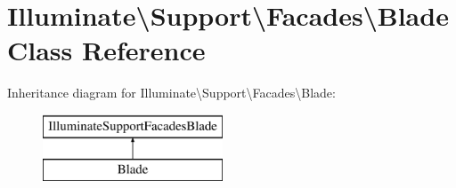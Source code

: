 \hypertarget{class_illuminate_1_1_support_1_1_facades_1_1_blade}{}\section{Illuminate\textbackslash{}Support\textbackslash{}Facades\textbackslash{}Blade Class Reference}
\label{class_illuminate_1_1_support_1_1_facades_1_1_blade}
Inheritance diagram for Illuminate\textbackslash{}Support\textbackslash{}Facades\textbackslash{}Blade\+:\begin{figure}[H]
\begin{center}
\leavevmode
\includegraphics[height=2.000000cm]{class_illuminate_1_1_support_1_1_facades_1_1_blade}
\end{center}
\end{figure}
